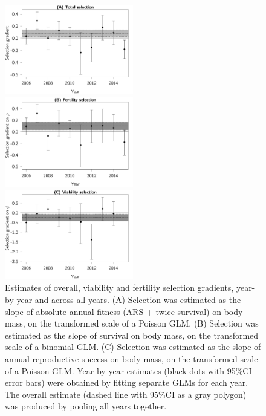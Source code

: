 \begin{figure}[ht]
\centering
	\includegraphics[width=0.5\textwidth]{FiguresFluSel/SelByYear-1}
	
	\includegraphics[width=0.5\textwidth]{FiguresFluSel/SelByYearRho-1}
	
	\includegraphics[width=0.5\textwidth]{FiguresFluSel/SelByYearPhi-1}
	\caption{Estimates of overall, viability and fertility selection gradients, year-by-year and across all years. (A) Selection was estimated as the slope of absolute annual fitness (ARS + twice survival) on body mass, on the transformed scale of a Poisson GLM. (B) Selection was estimated as the slope of survival on body mass, on the transformed scale of a binomial GLM. (C) Selection was estimated as the slope of annual reproductive success on body mass, on the transformed scale of a Poisson GLM.
	Year-by-year estimates (black dots with 95\%CI error bars) were obtained by fitting separate GLMs for each year. The overall estimate (dashed line with 95\%CI as a gray polygon) was produced by pooling all years together.}
	\label{fig:yearSel}
\end{figure}

